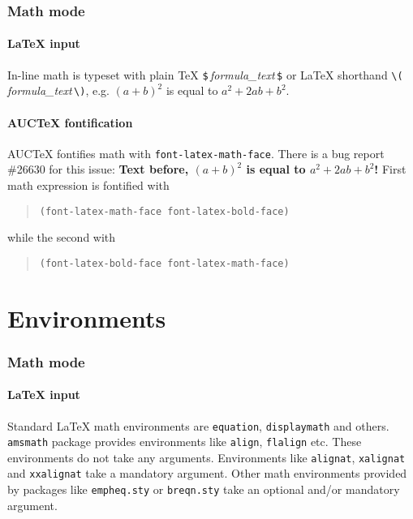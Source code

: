 \documentclass[a4paper]{article}
\begin{document}
\section{Math mode}

\subsection{\protect\LaTeX{} input}

In-line math is typeset with plain \TeX{}
\verb|$|\,\textsl{formula\_text}\,\verb|$| or \LaTeX{} shorthand
\verb|\(|\,\textsl{formula\_text}\,\verb|\)|, e.g. $(a+b)^2$ is equal
to \(a^2+2ab+b^2\).

\subsection{AUC\protect\TeX{} fontification}

AUC\TeX{} fontifies math with \texttt{font-latex-math-face}.  There is
a bug report \#26630 for this issue: {\bfseries Text before, $(a+b)^2$
  is equal to \(a^2+2ab+b^2\)!}  First math expression is fontified
with
\begin{quote}
\verb|(font-latex-math-face font-latex-bold-face)|
\end{quote}
while the second with
\begin{quote}
\verb|(font-latex-bold-face font-latex-math-face)|
\end{quote}

\part{Environments}

\section{Math mode}

\subsection{\protect\LaTeX{} input}

Standard \LaTeX{} math environments are \verb|equation|,
\verb|displaymath| and others.  \verb|amsmath| package provides
environments like \verb|align|, \verb|flalign| etc.  These
environments do not take any arguments.  Environments like
\verb|alignat|, \verb|xalignat| and \verb|xxalignat| take a mandatory
argument.  Other math environments provided by packages like
\verb|empheq.sty| or \verb|breqn.sty| take an optional and/or
mandatory argument.
\end{document}
